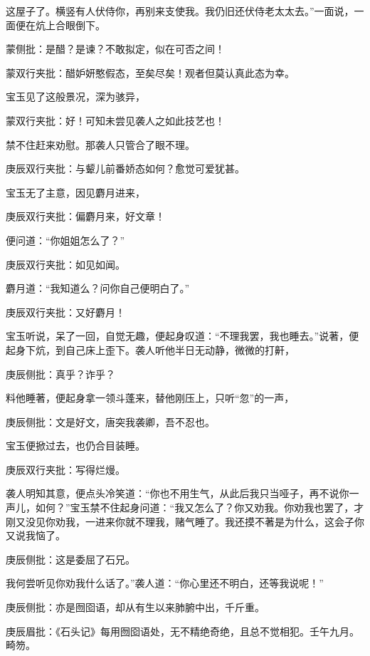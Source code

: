 \begin{parag}
这屋子了。横竖有人伏侍你，再别来支使我。我仍旧还伏侍老太太去。”一面说，一面便在炕上合眼倒下。\begin{note}蒙侧批：是醋？是谏？不敢拟定，似在可否之间！\end{note}\begin{note}蒙双行夹批：醋妒妍憨假态，至矣尽矣！观者但莫认真此态为幸。\end{note}宝玉见了这般景况，深为骇异，\begin{note}蒙双行夹批：好！可知未尝见袭人之如此技艺也！\end{note}禁不住赶来劝慰。那袭人只管合了眼不理。\begin{note}庚辰双行夹批：与颦儿前番娇态如何？愈觉可爱犹甚。\end{note}宝玉无了主意，因见麝月进来，\begin{note}庚辰双行夹批：偏麝月来，好文章！\end{note}便问道：“你姐姐怎么了？”\begin{note}庚辰双行夹批：如见如闻。\end{note}麝月道：“我知道么？问你自己便明白了。”\begin{note}庚辰双行夹批：又好麝月！\end{note}宝玉听说，呆了一回，自觉无趣，便起身叹道：“不理我罢，我也睡去。”说著，便起身下炕，到自己床上歪下。袭人听他半日无动静，微微的打鼾，\begin{note}庚辰侧批：真乎？诈乎？\end{note}料他睡著，便起身拿一领斗蓬来，替他刚压上，只听“忽”的一声，\begin{note}庚辰侧批：文是好文，唐突我袭卿，吾不忍也。\end{note}宝玉便掀过去，也仍合目装睡。\begin{note}庚辰双行夹批：写得烂熳。\end{note}袭人明知其意，便点头冷笑道：“你也不用生气，从此后我只当哑子，再不说你一声儿，如何？”宝玉禁不住起身问道：“我又怎么了？你又劝我。你劝我也罢了，才刚又没见你劝我，一进来你就不理我，赌气睡了。我还摸不著是为什么，这会子你又说我恼了。\begin{note}庚辰侧批：这是委屈了石兄。\end{note}我何尝听见你劝我什么话了。”袭人道：“你心里还不明白，还等我说呢！”\begin{note}庚辰侧批：亦是囫囵语，却从有生以来肺腑中出，千斤重。\end{note}\begin{note}庚辰眉批：《石头记》每用囫囵语处，无不精绝奇绝，且总不觉相犯。壬午九月。畸笏。\end{note}
\end{parag}


